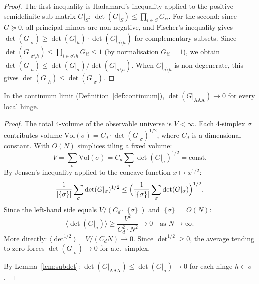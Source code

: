\begin{proof}
The first inequality is Hadamard's inequality applied to the positive
semidefinite sub-matrix $G|_S$: $\det(G|_S) \leq \prod_{i \in S} G_{ii}$.
For the second: since $G \succeq 0$, all principal minors are
non-negative, and Fischer's inequality gives
$\det(G|_\sigma) \geq \det(G|_h) \cdot \det(G|_{\sigma \setminus h})$
for complementary subsets.  Since
$\det(G|_{\sigma \setminus h}) \leq \prod_{i \in \sigma \setminus h}
G_{ii} \leq 1$ (by normalisation $G_{ii} = 1$), we obtain
$\det(G|_h) \leq \det(G|_\sigma) / \det(G|_{\sigma \setminus h})$.
When $G|_{\sigma \setminus h}$ is non-degenerate, this gives
$\det(G|_h) \leq \det(G|_\sigma)$.
\end{proof}

\begin{lemma}
\label{lem:degen}
In the continuum limit (Definition~\ref{def:continuum}),
$\det(G|_{\mathrm{AAA}}) \to 0$ for every local hinge.
\end{lemma}

\begin{proof}
The total 4-volume of the observable universe is $V < \infty$.  Each
4-simplex $\sigma$ contributes volume
$\mathrm{Vol}(\sigma) = C_d \cdot \det(G|_\sigma)^{1/2}$, where $C_d$
is a dimensional constant.  With $O(N)$ simplices tiling a fixed volume:
\begin{equation}
V = \sum_\sigma \mathrm{Vol}(\sigma)
  = C_d \sum_\sigma \det(G|_\sigma)^{1/2}
  = \mathrm{const}.
\end{equation}
By Jensen's inequality applied to the concave function $x \mapsto x^{1/2}$:
\begin{equation}
\frac{1}{|\{\sigma\}|} \sum_\sigma \det(G|_\sigma)^{1/2}
\leq \Bigl(\frac{1}{|\{\sigma\}|} \sum_\sigma \det(G|_\sigma)\Bigr)^{1/2}.
\end{equation}
Since the left-hand side equals $V / (C_d \cdot |\{\sigma\}|)$
and $|\{\sigma\}| = O(N)$:
\begin{equation}
\langle \det(G|_\sigma) \rangle \geq \frac{V^2}{C_d^2 \cdot N^2}
\to 0 \quad \text{as } N \to \infty.
\end{equation}
More directly: $\langle \det^{1/2} \rangle = V / (C_d N) \to 0$.
Since $\det^{1/2} \geq 0$, the average tending to zero forces
$\det(G|_\sigma) \to 0$ for a.e.\ simplex.

By Lemma~\ref{lem:subdet}: $\det(G|_{\mathrm{AAA}}) \leq
\det(G|_\sigma) \to 0$ for each hinge $h \subset \sigma$.
\end{proof}

